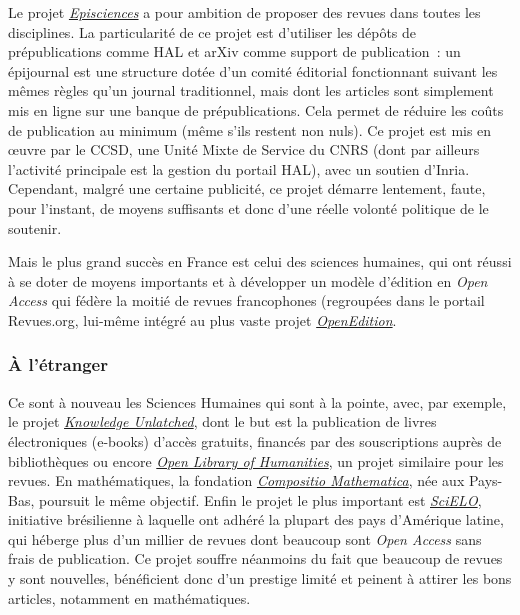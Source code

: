 Le projet \href{https://www.episciences.org/}{\emph{Episciences}} a pour ambition de proposer des revues dans toutes les disciplines. La particularit{\'e} de ce
projet est d'utiliser les d{\'e}p{\^o}ts de pr{\'e}publications comme HAL et arXiv comme support de publication~: un {\'e}pijournal est une structure dot{\'e}e d'un comit{\'e}
{\'e}ditorial fonctionnant suivant les m{\^e}mes r{\`e}gles qu'un journal traditionnel, mais dont les articles sont simplement mis en ligne sur une banque de
pr{\'e}publications. Cela permet de r{\'e}duire les co{\^u}ts de publication au minimum (m{\^e}me s'ils restent non nuls). Ce projet est mis en {\oe}uvre par le CCSD,
une Unit{\'e} Mixte de Service du CNRS (dont par ailleurs l'activit{\'e} principale est la gestion du portail HAL), avec un soutien d'Inria. Cependant,
malgr{\'e} une certaine publicit{\'e}, ce projet d{\'e}marre lentement, faute, pour l'instant, de moyens suffisants et donc d'une r{\'e}elle volont{\'e} politique de le soutenir.

Mais le plus grand succ{\`e}s en France est celui des sciences humaines, qui ont r{\'e}ussi {\`a} se doter de moyens importants et {\`a} d{\'e}velopper un mod{\`e}le
d'{\'e}dition en \emph{Open Access} qui f{\'e}d{\`e}re la moiti{\'e} de revues francophones (regroup{\'e}es dans le portail Revues.org, lui-m{\^e}me int{\'e}gr{\'e} au plus vaste
projet \href{https://www.openedition.org/}{\emph{OpenEdition}}.

\subsubsection{\`A l'{\'e}tranger}

Ce sont {\`a} nouveau les Sciences Humaines qui sont {\`a} la pointe, avec, par exemple, le projet \href{http://www.knowledgeunlatched.org/}{\emph{Knowledge Unlatched}}, dont le but est la publication de
livres {\'e}lectroniques (e-books) d'acc{\`e}s gratuits, financ{\'e}s par des souscriptions aupr{\`e}s de biblioth{\`e}ques ou encore \href{https://www.openlibhums.org/}{\emph{Open Library of Humanities}},
un projet similaire pour les revues. En math{\'e}matiques, la fondation \href{https://compositio.nl/#}{\emph{Compositio Mathematica}}, n{\'e}e aux Pays-Bas, poursuit le m{\^e}me objectif. Enfin
le projet le plus important est  \href{http://www.scielo.org}{\emph{SciELO}}, initiative br{\'e}silienne {\`a} laquelle ont adh{\'e}r{\'e} la plupart des pays d'Am{\'e}rique
latine, qui h{\'e}berge plus d'un millier de revues dont beaucoup sont \emph{Open Access} sans frais de publication. Ce projet souffre n{\'e}anmoins du fait
que beaucoup de revues y sont nouvelles, b{\'e}n{\'e}ficient donc d'un prestige limit{\'e} et peinent {\`a} attirer les bons articles, notamment en math{\'e}matiques.

